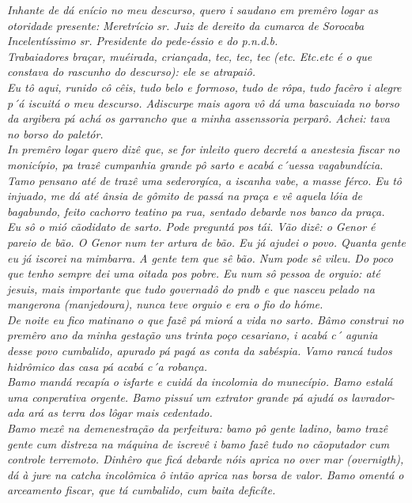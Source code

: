 \documentclass[12pt,brazil,]{book}
\begin{document}
\emph{Inhante de dá enício no meu descurso, quero i saudano em premêro
logar as otoridade presente:} \emph{Meretrício sr. Juiz de dereito da
cumarca de Sorocaba}\\
\emph{Incelentíssimo sr. Presidente do pede-éssio e do p.n.d.b.}\\
\emph{Trabaiadores braçar, muéirada, criançada, tec, tec, tec (etc.
Etc.etc é o que constava do rascunho do descurso): ele se atrapaiô.}\\
\emph{Eu tô aqui, runido cô cêis, tudo belo e formoso, tudo de rôpa,
tudo facêro i alegre p´á iscuitá o meu descurso. Adiscurpe mais agora vô
dá uma bascuiada no borso da argibera pá achá os garrancho que a minha
assenssoria perparô. Achei: tava no borso do paletór.}\\
\emph{In premêro logar quero dizê que, se for inleito quero decretá a
anestesia fiscar no monicípio, pa trazê cumpanhia grande pô sarto e
acabá c´uessa vagabundícia. Tamo pensano até de trazê uma sederorgíca, a
iscanha vabe, a masse férco. Eu tô injuado, me dá até ânsia de gômito de
passá na praça e vê aquela lóia de bagabundo, feito cachorro teatino pa
rua, sentado debarde nos banco da praça.}\\
\emph{Eu sô o mió cãodidato de sarto. Pode preguntá pos tái. Vão dizê: o
Genor é pareio de bão. O Genor num ter artura de bão. Eu já ajudei o
povo. Quanta gente eu já iscorei na mimbarra. A gente tem que sê bão.
Num pode sê vileu. Do poco que tenho sempre dei uma oitada pos pobre. Eu
num sô pessoa de orguio: até jesuis, mais importante que tudo governadô
do pndb e que nasceu pelado na mangerona (manjedoura), nunca teve orguio
e era o fio do hóme.}\\
\emph{De noite eu fico matinano o que fazê pá miorá a vida no sarto.
Bâmo construi no premêro ano da minha gestação uns trinta poço
cesariano, i acabá c´ agunia desse povo cumbalido, apurado pá pagá as
conta da sabéspia. Vamo rancá tudos hidrômico das casa pá acabá c´a
robança.}\\
\emph{Bamo mandá recapía o isfarte e cuidá da incolomia do munecípio.
Bamo estalá uma conperativa orgente. Bamo pissuí um extrator grande pá
ajudá os lavrador-ada ará as terra dos lôgar mais cedentado.}\\
\emph{Bamo mexê na demenestração da perfeitura: bamo pô gente ladino,
bamo trazê gente cum distreza na máquina de iscrevê i bamo fazê tudo no
cãoputador cum controle terremoto. Dinhêro que ficá debarde nóis aprica
no over mar (overnigth), dá à jure na catcha incolômica ô intão aprica
nas borsa de valor. Bamo omentá o arceamento fiscar, que tá cumbalido,
cum baita deficíte.}\\
\end{document}
